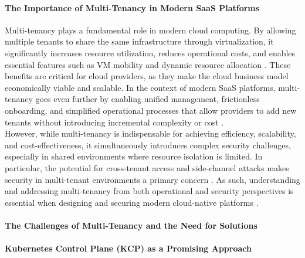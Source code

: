 \documentclass[11pt, a4paper, oneside, draft]{scrartcl}
\begin{document}
            \paragraph{The Importance of Multi-Tenancy in Modern SaaS Platforms}
                Multi-tenancy plays a fundamental role in modern cloud computing. 
                By allowing multiple tenants to share the same infrastructure through
                virtualization, it significantly increases resource utilization, reduces operational
                costs, and enables essential features such as VM mobility and dynamic resource
                allocation \parencite[pp.~345--346]{IEEEMultiTenancySecurityConcerns}. 
                These benefits are critical for cloud providers, as they make the cloud business
                model economically viable and scalable. 
                In the context of modern SaaS platforms, multi-tenancy goes even further by enabling
                unified management, frictionless onboarding, and simplified operational processes
                that allow providers to add new tenants without introducing incremental complexity
                or cost \parencite[pp.~9--11]{awsSaaSArchitectureFundamentals}.
                \\
                However, while multi-tenancy is indispensable for achieving efficiency, scalability,
                and cost-effectiveness, it simultaneously introduces complex security challenges,
                especially in shared environments where resource isolation is limited. 
                In particular, the potential for cross-tenant access and side-channel attacks makes
                security in multi-tenant environments a primary concern
                \parencite[pp.~345--346]{IEEEMultiTenancySecurityConcerns}. 
                As such, understanding and addressing multi-tenancy from both operational and
                security perspectives is essential when designing and securing modern cloud-native
                platforms
                \parencites[pp.~9--11]{awsSaaSArchitectureFundamentals}[p.~4]{isoConcepts}.

            \paragraph{The Challenges of Multi-Tenancy and the Need for Solutions}
                

            \paragraph{Kubernetes Control Plane (KCP) as a Promising Approach}
\end{document}
